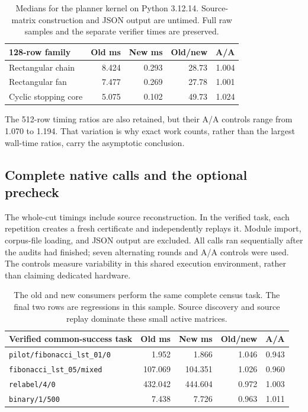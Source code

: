 \begin{table}[htbp]
\centering\small
\begin{tabular}{@{}lrrrr@{}}
\toprule
128-row family & Old ms & New ms & Old/new & A/A\\
\midrule
Rectangular chain & 8.424 & 0.293 & 28.73 & 1.004\\
Rectangular fan & 7.477 & 0.269 & 27.78 & 1.001\\
Cyclic stopping core & 5.075 & 0.102 & 49.73 & 1.024\\
\bottomrule
\end{tabular}
\caption{Medians for the planner kernel on Python 3.12.14.  Source-matrix
construction and JSON output are untimed.  Full raw samples and the
separate verifier times are preserved.}
\end{table}

The 512-row timing ratios are also retained, but their A/A controls range
from 1.070 to 1.194.  That variation is why exact work counts, rather than
the largest wall-time ratios, carry the asymptotic conclusion.

\subsection{Complete native calls and the optional precheck}

The whole-cut timings include source reconstruction.  In the verified
task, each repetition creates a fresh certificate and independently replays
it.  Module import, corpus-file loading, and JSON output are excluded.
All calls ran sequentially after the audits had finished; seven alternating
rounds and A/A controls were used.  The controls measure variability in
this shared execution environment, rather than claiming dedicated hardware.

\begin{table}[htbp]
\centering\small
\begin{tabularx}{\linewidth}{@{}Yrrrr@{}}
\toprule
Verified common-success task & Old ms & New ms & Old/new & A/A\\
\midrule
\texttt{pilot/fibonacci\_lst\_01/0} & 1.952 & 1.866 & 1.046 & 0.943\\
\texttt{fibonacci\_lst\_05/mixed} & 107.069 & 104.351 & 1.026 & 0.960\\
\texttt{relabel/4/0} & 432.042 & 444.604 & 0.972 & 1.003\\
\texttt{binary/1/500} & 7.438 & 7.726 & 0.963 & 1.011\\
\bottomrule
\end{tabularx}
\caption{The old and new consumers perform the same complete census task.
The final two rows are regressions in this sample.  Source discovery and
source replay dominate these small active matrices.}
\end{table}

